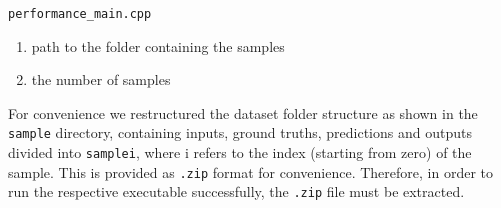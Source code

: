 \noindent
\verb|performance_main.cpp| 
\begin{enumerate}
    \item path to the folder containing the samples
    \item the number of samples
\end{enumerate}
For convenience we restructured the dataset folder structure as shown in the \verb|sample| directory, containing inputs, ground truths, predictions and outputs divided into \verb|samplei|, where i refers to the index (starting from zero) of the sample.
This is provided as \verb|.zip| format for convenience. Therefore, in order to run the respective executable
successfully, the \verb|.zip| file must be extracted.

